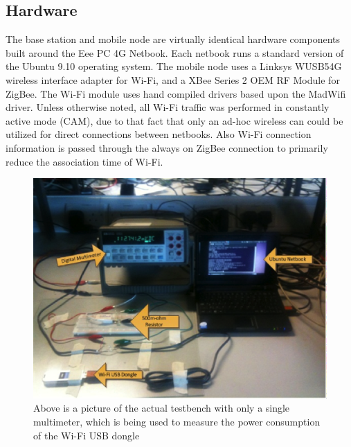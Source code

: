 \documentclass[conference]{IEEEtran}
\begin{document}
\subsection{Hardware}
The base station and mobile node are virtually identical hardware components built around the Eee PC 4G Netbook. Each netbook runs a standard version of the Ubuntu 9.10 operating system.  The mobile node uses a Linksys WUSB54G wireless interface adapter for Wi-Fi, and a XBee Series 2 OEM RF Module for ZigBee. The Wi-Fi module uses hand compiled drivers based upon the MadWifi driver. Unless otherwise noted, all Wi-Fi traffic was performed in constantly active mode (CAM), due to that fact that only an ad-hoc wireless can could be utilized for direct connections between netbooks.  Also Wi-Fi connection information is passed through the always on ZigBee connection to primarily reduce the association time of Wi-Fi.

\begin{figure}
\begin{center}
\includegraphics[scale=0.50]{actual_testbench.eps}
\caption{Above is a picture of the actual testbench with only a single multimeter, which is being used to measure the power consumption of the Wi-Fi USB dongle}
\end{center}
\end{figure}
\end{document}
